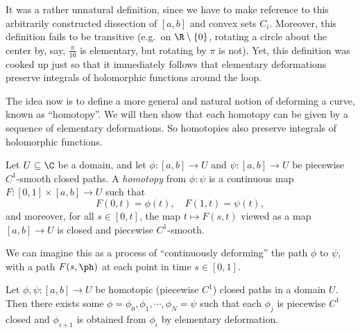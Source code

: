\documentclass[a4paper]{article}
\begin{document}
It was a rather unnatural definition, since we have to make reference to this arbitrarily constructed dissection of $[a, b]$ and convex sets $C_i$. Moreover, this definition fails to be transitive (e.g.\ on $\R \setminus \{0\}$, rotating a circle about the center by, say, $\frac{\pi}{10}$ is elementary, but rotating by $\pi$ is not). Yet, this definition was cooked up just so that it immediately follows that elementary deformations preserve integrals of holomorphic functions around the loop.

The idea now is to define a more general and natural notion of deforming a curve, known as ``homotopy''. We will then show that each homotopy can be given by a sequence of elementary deformations. So homotopies also preserve integrals of holomorphic functions.

\begin{defi}
  Let $U \subseteq \C$ be a domain, and let $\phi: [a, b] \to U$ and $\psi: [a, b] \to U$ be piecewise $C^1$-smooth closed paths. A \emph{homotopy} from $\phi: \psi$ is a continuous map $F: [0, 1] \times [a, b] \to U$ such that
  \[
    F(0, t) = \phi(t),\quad F(1, t) = \psi(t),
  \]
  and moreover, for all $s \in [0, t]$, the map $t \mapsto F(s, t)$ viewed as a map $[a, b] \to U$ is closed and piecewise $C^1$-smooth.
\end{defi}
We can imagine this as a process of ``continuously deforming'' the path $\phi$ to $\psi$, with a path $F(s, \ph)$ at each point in time $s \in [0, 1]$.

\begin{prop}
  Let $\phi, \psi: [a, b] \to U$ be homotopic (piecewise $C^1$) closed paths in a domain $U$. Then there exists some $\phi = \phi_0, \phi_1, \cdots, \phi_N = \psi$ such that each $\phi_j$ is piecewise $C^1$ closed and $\phi_{i + 1}$ is obtained from $\phi_i$ by elementary deformation.
\end{prop}
\end{document}
